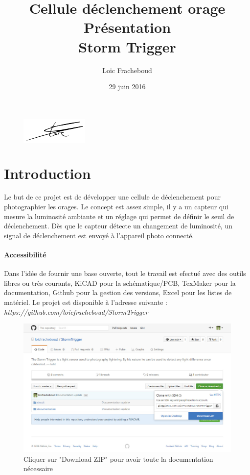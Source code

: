 \documentclass[a4paper,10pt]{article}
\author{Loïc Fracheboud}
\title{Cellule déclenchement orage \\ Présentation \\ \Huge Storm Trigger}
\date{29 juin 2016}
\begin{document}
 \maketitle

 \begin{figure}[!h]
 \centering
 \vspace{80pt}
 \includegraphics[scale=0.2]{images/signfracheboud}
 \end{figure}
 \pagebreak
 
 \section{Introduction}
  Le but de ce projet est de développer une cellule de déclenchement pour photographier les orages. Le concept est assez simple, il y a un capteur qui mesure la luminosité ambiante et un réglage qui permet de définir le seuil de déclenchement. Dès que le capteur détecte un changement de luminosité, un signal de déclenchement est envoyé à l'appareil photo connecté. \\

 \paragraph{Accessibilité}
 Dans l'idée de fournir une base ouverte, tout le travail est efectué avec des outils libres ou très courants, KiCAD pour la schématique/PCB, TexMaker pour la documentation, Github pour la gestion des versions, Excel pour les listes de matériel.
Le projet est disponible à l'adresse suivante : {\itshape https://github.com/loicfracheboud/StormTrigger}
  \begin{figure}[!h]
 \centering
 \vspace{5pt}
 \includegraphics[scale=0.25]{images/git_dl}
 \caption{Cliquer sur "Download ZIP" pour avoir toute la documentation nécessaire}
 \end{figure}
\end{document}
